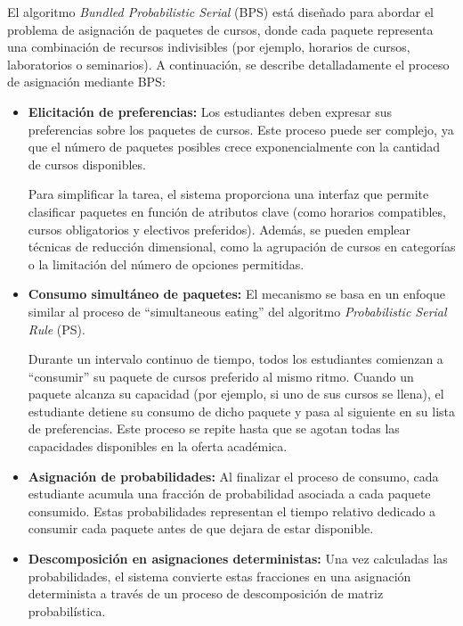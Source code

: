 \documentclass{article}
\begin{document}
El algoritmo \textit{Bundled Probabilistic Serial} (BPS) está diseñado para abordar el problema de asignación de paquetes de cursos, donde cada paquete representa una combinación de recursos indivisibles (por ejemplo, horarios de cursos, laboratorios o seminarios). A continuación, se describe detalladamente el proceso de asignación mediante BPS:

\begin{itemize}
    \item \textbf{Elicitación de preferencias:} Los estudiantes deben expresar sus preferencias sobre los paquetes de cursos. Este proceso puede ser complejo, ya que el número de paquetes posibles crece exponencialmente con la cantidad de cursos disponibles.

    Para simplificar la tarea, el sistema proporciona una interfaz que permite clasificar paquetes en función de atributos clave (como horarios compatibles, cursos obligatorios y electivos preferidos). Además, se pueden emplear técnicas de reducción dimensional, como la agrupación de cursos en categorías o la limitación del número de opciones permitidas.

    \item \textbf{Consumo simultáneo de paquetes:} El mecanismo se basa en un enfoque similar al proceso de ``simultaneous eating'' del algoritmo \textit{Probabilistic Serial Rule} (PS).

    Durante un intervalo continuo de tiempo, todos los estudiantes comienzan a ``consumir'' su paquete de cursos preferido al mismo ritmo. Cuando un paquete alcanza su capacidad (por ejemplo, si uno de sus cursos se llena), el estudiante detiene su consumo de dicho paquete y pasa al siguiente en su lista de preferencias. Este proceso se repite hasta que se agotan todas las capacidades disponibles en la oferta académica.

    \item \textbf{Asignación de probabilidades:} Al finalizar el proceso de consumo, cada estudiante acumula una fracción de probabilidad asociada a cada paquete consumido. Estas probabilidades representan el tiempo relativo dedicado a consumir cada paquete antes de que dejara de estar disponible.

    \item \textbf{Descomposición en asignaciones deterministas:} Una vez calculadas las probabilidades, el sistema convierte estas fracciones en una asignación determinista a través de un proceso de descomposición de matriz probabilística.


\end{itemize}
\end{document}
